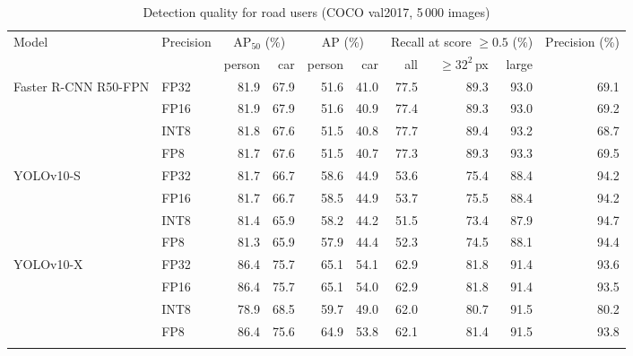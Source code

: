 \begin{table}[htbp]
\footnotesize\setlength{\tabcolsep}{2.5pt}
\caption{Detection quality for road users (COCO val2017, 5\,000 images)}\label{tab:operating}
\begin{tabular}{@{}llrrrrrrrr@{}}
\toprule
Model & Precision & \multicolumn{2}{c}{AP$_{50}$ (\%)} & \multicolumn{2}{c}{AP (\%)} & \multicolumn{3}{c}{Recall at score $\geq0.5$ (\%)} & Precision (\%) \\
\cmidrule{3-4}\cmidrule{5-6}\cmidrule{7-9}
 & & person & car & person & car & all & $\geq32^2$\,px & large & \\
\midrule
Faster R-CNN R50-FPN & FP32 & 81.9 & 67.9 & 51.6 & 41.0 & 77.5 & 89.3 & 93.0 & 69.1 \\
 & FP16 & 81.9 & 67.9 & 51.6 & 40.9 & 77.4 & 89.3 & 93.0 & 69.2 \\
 & INT8 & 81.8 & 67.6 & 51.5 & 40.8 & 77.7 & 89.4 & 93.2 & 68.7 \\
 & FP8 & 81.7 & 67.6 & 51.5 & 40.7 & 77.3 & 89.3 & 93.3 & 69.5 \\
\midrule
YOLOv10-S & FP32 & 81.7 & 66.7 & 58.6 & 44.9 & 53.6 & 75.4 & 88.4 & 94.2 \\
 & FP16 & 81.7 & 66.7 & 58.5 & 44.9 & 53.7 & 75.5 & 88.4 & 94.2 \\
 & INT8 & 81.4 & 65.9 & 58.2 & 44.2 & 51.5 & 73.4 & 87.9 & 94.7 \\
 & FP8 & 81.3 & 65.9 & 57.9 & 44.4 & 52.3 & 74.5 & 88.1 & 94.4 \\
\midrule
YOLOv10-X & FP32 & 86.4 & 75.7 & 65.1 & 54.1 & 62.9 & 81.8 & 91.4 & 93.6 \\
 & FP16 & 86.4 & 75.7 & 65.1 & 54.0 & 62.9 & 81.8 & 91.4 & 93.5 \\
 & INT8 & 78.9 & 68.5 & 59.7 & 49.0 & 62.0 & 80.7 & 91.5 & 80.2 \\
 & FP8 & 86.4 & 75.6 & 64.9 & 53.8 & 62.1 & 81.4 & 91.5 & 93.8 \\
\botrule
\end{tabular}
\end{table}
